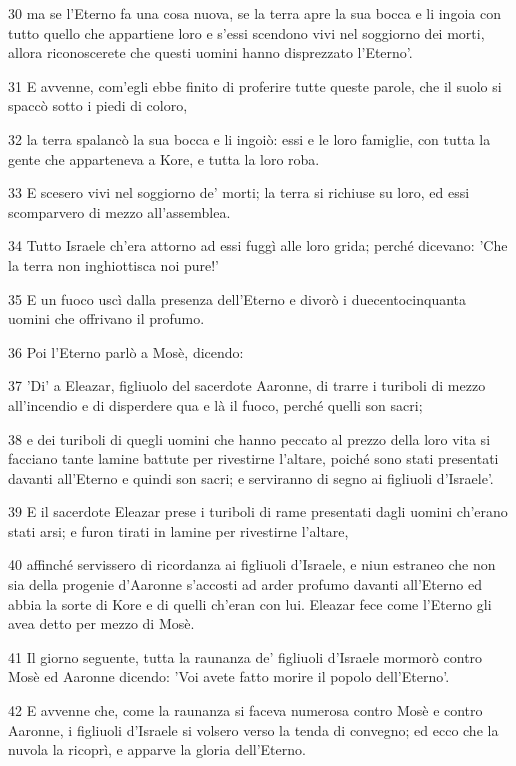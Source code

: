 \par 30 ma se l'Eterno fa una cosa nuova, se la terra apre la sua bocca e li ingoia con tutto quello che appartiene loro e s'essi scendono vivi nel soggiorno dei morti, allora riconoscerete che questi uomini hanno disprezzato l'Eterno'.
\par 31 E avvenne, com'egli ebbe finito di proferire tutte queste parole, che il suolo si spaccò sotto i piedi di coloro,
\par 32 la terra spalancò la sua bocca e li ingoiò: essi e le loro famiglie, con tutta la gente che apparteneva a Kore, e tutta la loro roba.
\par 33 E scesero vivi nel soggiorno de' morti; la terra si richiuse su loro, ed essi scomparvero di mezzo all'assemblea.
\par 34 Tutto Israele ch'era attorno ad essi fuggì alle loro grida; perché dicevano: 'Che la terra non inghiottisca noi pure!'
\par 35 E un fuoco uscì dalla presenza dell'Eterno e divorò i duecentocinquanta uomini che offrivano il profumo.
\par 36 Poi l'Eterno parlò a Mosè, dicendo:
\par 37 'Di' a Eleazar, figliuolo del sacerdote Aaronne, di trarre i turiboli di mezzo all'incendio e di disperdere qua e là il fuoco, perché quelli son sacri;
\par 38 e dei turiboli di quegli uomini che hanno peccato al prezzo della loro vita si facciano tante lamine battute per rivestirne l'altare, poiché sono stati presentati davanti all'Eterno e quindi son sacri; e serviranno di segno ai figliuoli d'Israele'.
\par 39 E il sacerdote Eleazar prese i turiboli di rame presentati dagli uomini ch'erano stati arsi; e furon tirati in lamine per rivestirne l'altare,
\par 40 affinché servissero di ricordanza ai figliuoli d'Israele, e niun estraneo che non sia della progenie d'Aaronne s'accosti ad arder profumo davanti all'Eterno ed abbia la sorte di Kore e di quelli ch'eran con lui. Eleazar fece come l'Eterno gli avea detto per mezzo di Mosè.
\par 41 Il giorno seguente, tutta la raunanza de' figliuoli d'Israele mormorò contro Mosè ed Aaronne dicendo: 'Voi avete fatto morire il popolo dell'Eterno'.
\par 42 E avvenne che, come la raunanza si faceva numerosa contro Mosè e contro Aaronne, i figliuoli d'Israele si volsero verso la tenda di convegno; ed ecco che la nuvola la ricoprì, e apparve la gloria dell'Eterno.
